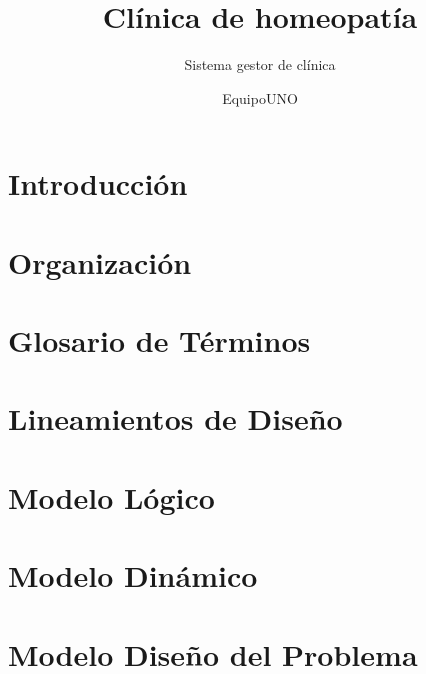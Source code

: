 \documentclass[oneside,10pt]{book}
\title{Clínica de homeopatía}
\subtitle{Sistema gestor de clínica}
\author{EquipoUNO}
\begin{document}
\maketitle
\thispagestyle{empty}

\frontmatter
\tableofcontents

\mainmatter

\chapter{Introducción}


\chapter{Organización}


\chapter{Glosario de Términos}



\chapter{Lineamientos de Diseño}
	

\chapter{Modelo Lógico}



\chapter{Modelo Dinámico}
	


\chapter{Modelo Diseño del Problema}

	
\end{document}
